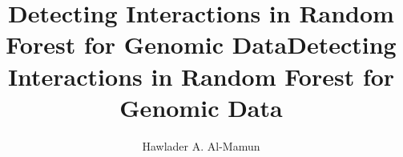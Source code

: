 \documentclass[authoryear,preprint,review,12pt]{elsarticle}
\begin{document}
\begin{frontmatter}


\title{Detecting Interactions in Random Forest for Genomic Data}
\author{Hawlader A. Al-Mamun}

\title{Detecting Interactions in Random Forest for Genomic Data}


\author{} %



\end{frontmatter}
\end{document}
